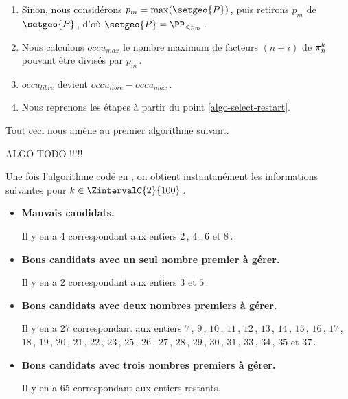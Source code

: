 \begin{enumerate}
	\item Sinon, nous considérons $p_m = \max ( \setgeo{P})$\,, puis retirons $p_m$ de $\setgeo{P}$\,, d'où $\setgeo{P} = \PP_{< p_m}$\,.
	


	\item Nous calculons $occu_{max}$ le nombre maximum de facteurs $(n+i)$ de $\consprod$ pouvant être divisés par $p_m$\,.
	


	\item $occu_{libre}$ devient $occu_{libre} - occu_{max}$\,.
	


	\item Nous reprenons les étapes à partir du point \ref{algo-select-restart}.
\end{enumerate}




\newpage

Tout ceci nous amène au premier algorithme suivant.

ALGO TODO !!!!!




\medskip

Une fois l'algorithme codé en \python, on obtient instantanément les informations suivantes pour $k \in \ZintervalC{2}{100}$\,.
%
\begin{itemize}
	\item \textbf{Mauvais candidats.}
	
	\noindent
	Il y en a 4 correspondant aux entiers $2$\,, $4$\,, $6$ et $8$\,.
	
	\item \textbf{Bons candidats avec un seul nombre premier à gérer.}
	
	\noindent
	Il y en a 2 correspondant aux entiers $3$ et $5$\,.
	
	\item \textbf{Bons candidats avec deux nombres premiers à gérer.}
	
	\noindent
	Il y en a 27 correspondant aux entiers $7$\,, $9$\,, $10$\,, $11$\,, $12$\,, $13$\,, $14$\,, $15$\,, $16$\,, $17$\,, $18$\,, $19$\,, $20$\,, $21$\,, $22$\,, $23$\,, $25$\,, $26$\,, $27$\,, $28$\,, $29$\,, $30$\,, $31$\,, $33$\,, $34$\,, $35$ et $37$\,.

	\item\textbf{Bons candidats avec trois nombres premiers à gérer.}
	
	\noindent
	Il y en a 65 correspondant aux entiers restants.
\end{itemize}



